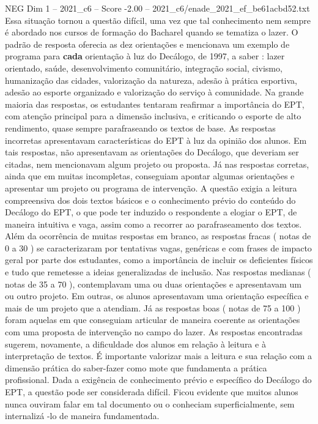 \begin{textsample}{NEG Dim 1 – 2021\_c6 – Score -2.00 – 2021\_c6/enade\_2021\_ef\_be61acbd52.txt}
Essa situação tornou a questão difícil, uma vez que tal conhecimento nem sempre é abordado nos cursos de formação do Bacharel quando se tematiza o lazer.
O padrão de resposta oferecia as dez orientações e mencionava um exemplo de programa para \textbf{cada} orientação à luz do Decálogo, de 1997, a saber : lazer orientado, saúde, desenvolvimento comunitário, integração social, civismo, humanização das cidades, valorização da natureza, adesão à prática esportiva, adesão ao esporte organizado e valorização do serviço à comunidade.
Na grande maioria das respostas, os estudantes tentaram reafirmar a importância do EPT, com atenção principal para a dimensão inclusiva, e criticando o esporte de alto rendimento, quase sempre parafraseando os textos de base.
As respostas incorretas apresentavam características do EPT à luz da opinião dos alunos.
Em tais respostas, não apresentavam as orientações do Decálogo, que deveriam ser citadas, nem mencionavam algum projeto ou proposta.
Já nas respostas corretas, ainda que em muitas incompletas, conseguiam apontar algumas orientações e apresentar um projeto ou programa de intervenção.
A questão exigia a leitura compreensiva dos dois textos básicos e o conhecimento prévio do conteúdo do Decálogo do EPT, o que pode ter induzido o respondente a elogiar o EPT, de maneira intuitiva e vaga, assim como a recorrer ao parafraseamento dos textos.
Além da ocorrência de muitas respostas em branco, as respostas fracas ( notas de 0 a 30 ) se caracterizaram por tentativas vagas, genéricas e com frases de impacto geral por parte dos estudantes, como a importância de incluir os deficientes físicos e tudo que remetesse a ideias generalizadas de inclusão.
Nas respostas medianas ( notas de 35 a 70 ), contemplavam uma ou duas orientações e apresentavam um ou outro projeto.
Em outras, os alunos apresentavam uma orientação específica e mais de um projeto que a atendiam.
Já as respostas boas ( notas de 75 a 100 ) foram aquelas em que conseguiam articular de maneira coerente as orientações com uma proposta de intervenção no campo do lazer.
As respostas encontradas sugerem, novamente, a dificuldade dos alunos em relação à leitura e à interpretação de textos.
É importante valorizar mais a leitura e sua relação com a dimensão prática do saber-fazer como mote que fundamenta a prática profissional.
Dada a exigência de conhecimento prévio e específico do Decálogo do EPT, a questão pode ser considerada difícil.
Ficou evidente que muitos alunos nunca ouviram falar em tal documento ou o conheciam superficialmente, sem internalizá -lo de maneira fundamentada.

\end{textsample}
